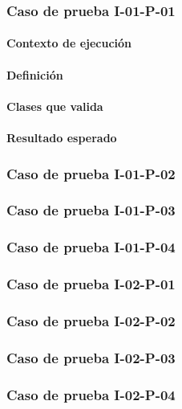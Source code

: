 \documentclass[10pt,a4paper]{article}
\begin{document}
			\subsubsection{Caso de prueba I-01-P-01}
			\paragraph{Contexto de ejecución}
			\paragraph{Definición}
			\paragraph{Clases que valida}
			\paragraph{Resultado esperado}

			\subsubsection{Caso de prueba I-01-P-02}

			\subsubsection{Caso de prueba I-01-P-03}

			\subsubsection{Caso de prueba I-01-P-04}

			\subsubsection{Caso de prueba I-02-P-01}

			\subsubsection{Caso de prueba I-02-P-02}

			\subsubsection{Caso de prueba I-02-P-03}

			\subsubsection{Caso de prueba I-02-P-04}
\end{document}
